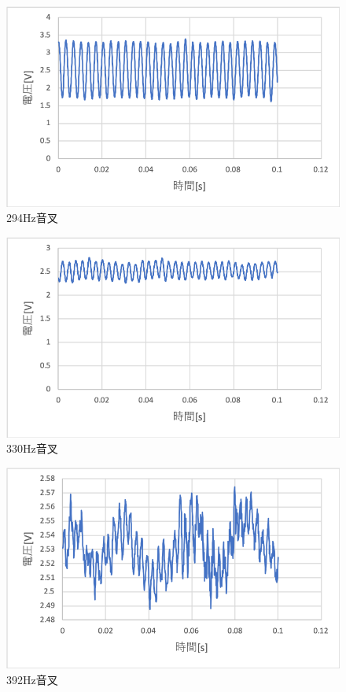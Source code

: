 \documentclass[11pt, a4paper,twocolumn]{jarticle}
\begin{document}
\begin{figure}[htbp]
 \begin{center}
  \includegraphics[width=0.8\linewidth]{fig18.png}
 \end{center}
 \caption{294Hz音叉}
 \label{fig:18}
\end{figure}

\begin{figure}[htbp]
 \begin{center}
  \includegraphics[width=0.8\linewidth]{fig19.png}
 \end{center}
 \caption{330Hz音叉}
 \label{fig:19}
\end{figure}

\begin{figure}[htbp]
 \begin{center}
  \includegraphics[width=0.8\linewidth]{fig20.png}
 \end{center}
 \caption{392Hz音叉}
 \label{fig:20}
\end{figure}
\end{document}
